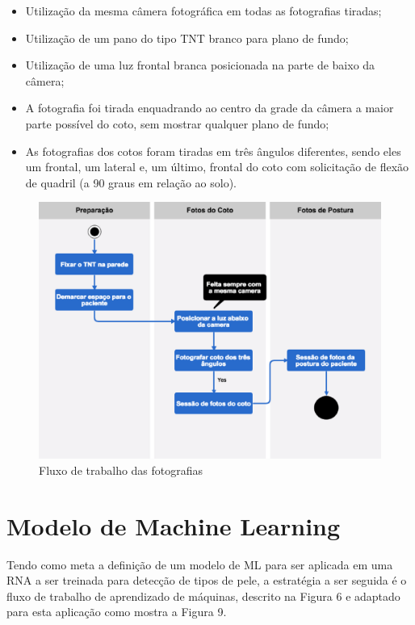     \begin{itemize}
        \item Utilização da mesma câmera fotográfica em todas as fotografias tiradas;
        \item Utilização de um pano do tipo TNT branco para plano de fundo;
        \item Utilização de uma luz frontal branca posicionada na parte de baixo da câmera;
        \item A fotografia foi tirada enquadrando ao centro da grade da câmera a maior parte possível do coto, sem mostrar qualquer plano de fundo;
        \item As fotografias dos cotos foram tiradas em três ângulos diferentes, sendo eles um frontal, um lateral e, um último, frontal do coto com solicitação de flexão de quadril (a 90 graus em relação ao solo).
    \end{itemize}

    \begin{figure}[ht]
        \centering
        \label{fig08}
            \includegraphics[keepaspectratio=true, scale=0.4]{editaveis/images/fotos_flow.eps}
        \caption{Fluxo de trabalho das fotografias}
    \end{figure}


\section{Modelo de Machine Learning}

    Tendo como meta a definição de um modelo de ML para ser aplicada em uma RNA a ser treinada para detecção de tipos de pele, a estratégia a ser seguida é o fluxo de trabalho de aprendizado de máquinas, descrito na Figura 6 e adaptado para esta aplicação como mostra a Figura 9.

